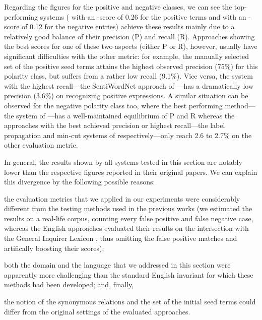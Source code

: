 Regarding the figures for the positive and negative classes, we can
see the top-performing systems (\citet{Blair-Goldensohn:08} with an
\F{}-score of 0.26 for the positive terms and \citet{Hu:04} with an
\F{}-score of 0.12 for the negative entries) achieve these results
mainly due to a relatively good balance of their precision (P) and
recall (R).  Approaches showing the best scores for one of these two
aspects (either P or R), however, usually have significant
difficulties with the other metric: for example, the manually selected
set of the positive seed terms attains the highest observed precision
(75\%) for this polarity class, but suffers from a rather low recall
(9.1\%).  Vice versa, the system with the highest recall---the
SentiWordNet approach of \citet{Esuli:06c}---has a dramatically low
precision (3.6\%) on recognizing positive expressions.  A similar
situation can be observed for the negative polarity class too, where
the best performing method---the system of \citet{Hu:04}---has a
well-maintained equilibrium of P and R whereas the approaches with the
best achieved precision or highest recall---the label propagation and
min-cut systems of \citet{Rao:09} respectively---only reach 2.6 to
2.7\% on the other evaluation metric.

In general, the results shown by all systems tested in this section
are notably lower than the respective figures reported in their
original papers.  We can explain this divergence by the following
possible reasons:
\begin{inparaenum}
\item the evaluation metrics that we applied in our experiments were
  considerably different from the testing methods used in the previous
  works (we estimated the results on a real-life corpus, counting
  every false positive and false negative case, whereas the English
  approaches evaluated their results on the intersection with the
  General Inquirer Lexicon \cite{Stone:66}, thus omitting the false
  positive matches and artifically boosting their scores);
\item both the domain and the language that we addressed in this
  section were apparently more challenging than the standard English
  invariant for which these methods had been developed; and, finally,
\item the notion of the synonymous relations and the set of the
  initial seed terms could differ from the original settings of the
  evaluated approaches.
\end{inparaenum}

